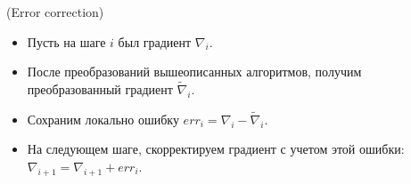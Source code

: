 \begin{algorithm}(Error correction)
  \begin{itemize}
    \item Пусть на шаге $i$ был градиент $\nabla_i$.
    \item После преобразований вышеописанных алгоритмов, получим преобразованный
      градиент $\tilde{\nabla}_i$.
    \item Сохраним локально ошибку $err_i = \nabla_i - \tilde{\nabla}_i$.
    \item На следующем шаге, скорректируем градиент с учетом этой ошибки:
      $\nabla_{i + 1} = \nabla_{i + 1} + err_i$.
  \end{itemize}
\end{algorithm}
